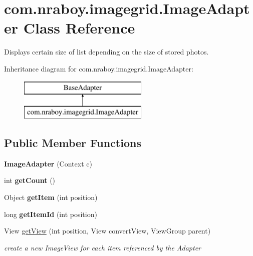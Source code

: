 \hypertarget{classcom_1_1nraboy_1_1imagegrid_1_1_image_adapter}{}\section{com.\+nraboy.\+imagegrid.\+Image\+Adapter Class Reference}
\label{classcom_1_1nraboy_1_1imagegrid_1_1_image_adapter}


Displays certain size of list depending on the size of stored photos.  


Inheritance diagram for com.\+nraboy.\+imagegrid.\+Image\+Adapter\+:\begin{figure}[H]
\begin{center}
\leavevmode
\includegraphics[height=2.000000cm]{classcom_1_1nraboy_1_1imagegrid_1_1_image_adapter}
\end{center}
\end{figure}
\subsection*{Public Member Functions}
\begin{DoxyCompactItemize}
\item 
\hypertarget{classcom_1_1nraboy_1_1imagegrid_1_1_image_adapter_a459bfa4faa7820b3d0b1a25ac143f22a}{}{\bfseries Image\+Adapter} (Context c)\label{classcom_1_1nraboy_1_1imagegrid_1_1_image_adapter_a459bfa4faa7820b3d0b1a25ac143f22a}

\item 
\hypertarget{classcom_1_1nraboy_1_1imagegrid_1_1_image_adapter_aea06691d0ecf89acb951901006ee90ab}{}int {\bfseries get\+Count} ()\label{classcom_1_1nraboy_1_1imagegrid_1_1_image_adapter_aea06691d0ecf89acb951901006ee90ab}

\item 
\hypertarget{classcom_1_1nraboy_1_1imagegrid_1_1_image_adapter_a8788d416d5b172b8edba14ad1b7a8f02}{}Object {\bfseries get\+Item} (int position)\label{classcom_1_1nraboy_1_1imagegrid_1_1_image_adapter_a8788d416d5b172b8edba14ad1b7a8f02}

\item 
\hypertarget{classcom_1_1nraboy_1_1imagegrid_1_1_image_adapter_aa1783e94fab80b95f879266a3055c3d5}{}long {\bfseries get\+Item\+Id} (int position)\label{classcom_1_1nraboy_1_1imagegrid_1_1_image_adapter_aa1783e94fab80b95f879266a3055c3d5}

\item 
View \hyperlink{classcom_1_1nraboy_1_1imagegrid_1_1_image_adapter_a69e1a3e0a4f66193b62d47bb877fcda6}{get\+View} (int position, View convert\+View, View\+Group parent)
\begin{DoxyCompactList}\small\item\em create a new Image\+View for each item referenced by the Adapter \end{DoxyCompactList}\end{DoxyCompactItemize}


